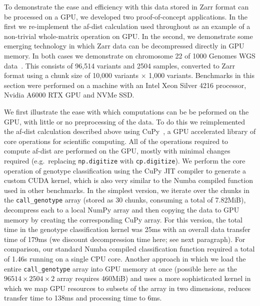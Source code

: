 \documentclass[a4paper,num-refs]{oup-contemporary}
\begin{document}
To demonstrate the ease and efficiency with this data stored in Zarr
format can be processed on a GPU, we developed two proof-of-concept
applications. In the first we re-implement the af-dist calculation
used throughout as an example of a non-trivial whole-matrix operation
on GPU. In the second, we demonstrate some emerging technology
in which Zarr data can be decompressed directly in GPU memory.
In both cases we demonstrate on chromosome 22 of
1000 Genomes WGS data~\citep{byrska2022high}. This consists
of 96,514 variants and 2504 samples, converted to Zarr format
using a chunk size of 10,000 variants $\times$ 1,000 variants.
Benchmarks in this section were performed on a
machine with an Intel Xeon Silver 4216 processor,
Nvidia A6000 RTX GPU and NVMe SSD.

We first illustrate the ease with which computations can be
be peformed on the GPU, with little or no preprocessing of the
data. To do this we reimplemented the af-dist calculation
described above using CuPy~\citep{okuta2017cupy}, a GPU accelerated library
of core operations for scientific computing.
All of the operations required to compute  af-dist are
performed on the GPU, mostly with minimal changes required
(e.g.\ replacing \texttt{np.digitize} with \texttt{cp.digitize}).
We perform the core operation of genotype classification using the
CuPy JIT compiler to generate a custom CUDA kernel, which
is also very similar to the Numba compiled function used in other
benchmarks. In the simplest version, we iterate over the chunks
in the \texttt{call\_genotype} array (stored as 30 chunks, consuming
a total of 7.82MiB), decompress each to a local
NumPy array and then copying the data to GPU memory by creating
the corresponding CuPy array. For this version, the total time
in the genotype classification kernel was 25ms with an
overall data transfer time of 179ms (we discount decompression
time here; see next paragraph). For comparison,
our standard Numba compiled classification function required
a total of 1.46s running on a single CPU core.
Another approach in which we load the entire
\texttt{call\_genotype} array into GPU memory at once (possible
here as the $96514 \times 2504 \times 2$ array requires
460MiB) and uses
a more sophisticated kernel in which we map GPU resources to
subsets of the array in two dimensions,
reduces transfer
time to 138ms and processing time to 6ms.
\end{document}
